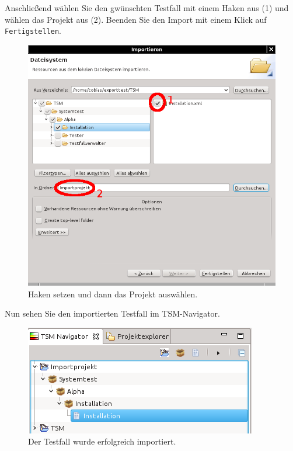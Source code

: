 \documentclass[11pt,a4paper,titlepage]{article}
\begin{document}
\vspace{\baselineskip}
Anschließend wählen Sie den gwünschten Testfall mit einem Haken aus (1) und wählen das Projekt aus (2). Beenden Sie den Import mit einem Klick auf \texttt{Fertigstellen}.
\begin{figure}[H]
 \centering
 \includegraphics{./assistent-imp2.png}
 \caption{Haken setzen und dann das Projekt auswählen.}
 \label{abb:Assistent-imp2}
\end{figure}
\vspace{\baselineskip}
Nun sehen Sie den importierten Testfall im TSM-Navigator.
\begin{figure}[H]
 \centering
 \includegraphics{./importierter-testfall.png}
 \caption{Der Testfall wurde erfolgreich importiert.}
 \label{abb:Importierter-testfall}
\end{figure}
\end{document}

